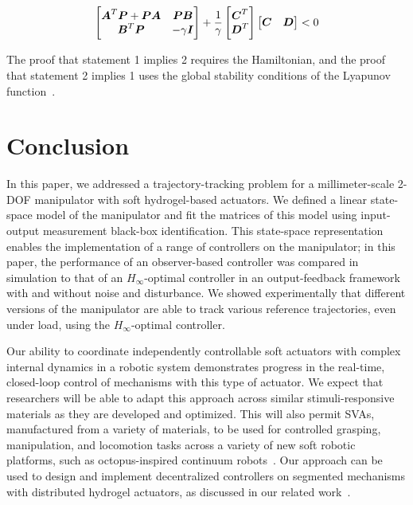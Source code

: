     \begin{equation*}
		\begin{bmatrix}
		\boldsymbol{A}^T\boldsymbol{P}+\boldsymbol{PA} &  \boldsymbol{PB} \\
		\boldsymbol{B}^T\boldsymbol{P}    & -\gamma \boldsymbol{I} \\
		\end{bmatrix}+\dfrac{1}{\gamma}	\begin{bmatrix}
		\boldsymbol{C}^T\\
		\boldsymbol{D}^T\\
		\end{bmatrix}\begin{bmatrix}
		\boldsymbol{C} & \boldsymbol{D}\\
		\end{bmatrix} < 0
		\label{eq-LMI}
		\end{equation*}

The proof that statement 1 implies 2 requires the Hamiltonian, and the proof that statement 2 implies 1 uses the global stability conditions of the Lyapunov function~\cite{boyd1994}.
\section{Conclusion}

In this paper, we addressed a trajectory-tracking problem for a millimeter-scale 2-DOF manipulator with soft hydrogel-based actuators. We defined a linear state-space model of the manipulator and fit the matrices of this model using input-output measurement black-box identification. This state-space representation enables the implementation of a range of controllers on the manipulator; in this paper, the performance of an observer-based controller was compared in simulation to that of an $H_{\infty}$-optimal controller in an output-feedback framework with and without noise and disturbance. We showed experimentally that different versions of the manipulator are able to track various reference trajectories, even under load, using the $H_{\infty}$-optimal controller.

Our ability to coordinate independently controllable soft actuators with complex internal dynamics in a robotic system demonstrates progress in the real-time, closed-loop control of mechanisms with this type of actuator. We expect that researchers will be able to adapt this approach across similar stimuli-responsive materials as they are developed and optimized. This will also permit SVAs, manufactured from a variety of materials, to be used for controlled grasping, manipulation, and locomotion tasks across a variety of new soft robotic platforms, such as octopus-inspired continuum robots~\cite{doroudchi2020dynamic}. Our approach can be used to design and implement decentralized controllers on segmented mechanisms with distributed hydrogel actuators, as discussed in our related work~\cite{doroudchi2020dynamic,doroudchi2018decentralized}.

